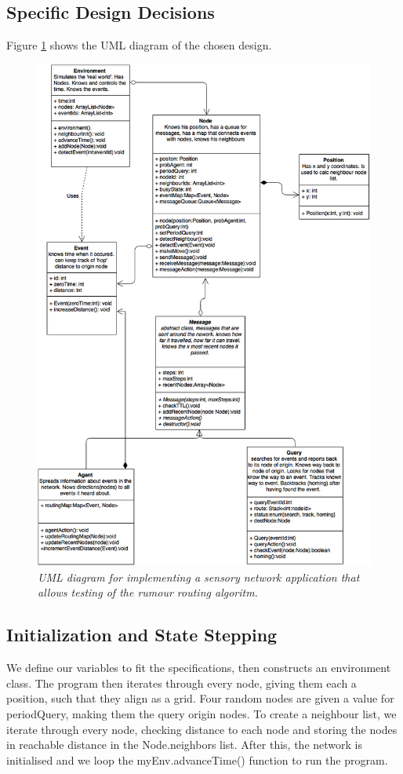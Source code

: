 \documentclass[a4paper,11pt,twoside]{article}
\begin{document}
\subsection{Specific Design Decisions}
Figure \ref{fig:uml} shows the UML diagram of the chosen design. 
\begin{figure}
\centering
\includegraphics[width=\textwidth]{uml.png}
\caption{\textit{UML diagram for implementing a sensory network application
  that allows testing of the rumour routing algoritm.}}
\label{fig:uml}
\end{figure}

\subsection{Initialization and State Stepping}
We define our variables to fit the specifications, then constructs an
environment class. The program then iterates through every node,
giving them each a position, such that they align as a grid. Four
random nodes are given a value for periodQuery, making them the query
origin nodes. To create a neighbour list, we iterate through every
node, checking distance to each node and storing the nodes in
reachable distance in the Node.neighbors list. 
After this, the network is initialised and we loop the
myEnv.advanceTime() function to run the program.
\end{document}
